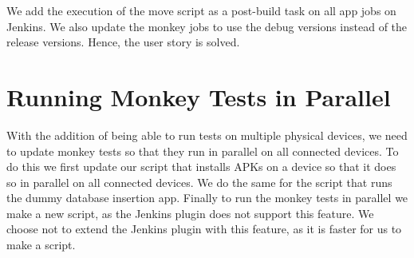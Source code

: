 We add the execution of the move script as a post-build task on all app jobs on Jenkins. We also update the monkey jobs to use the debug versions instead of the release versions. Hence, the user story is solved.

\section{Running Monkey Tests in Parallel}\label{sec:monkey_in_parallel}
With the addition of being able to run tests on multiple physical devices, we need to update monkey tests so that they run in parallel on all connected devices. To do this we first update our script that installs APKs on a device so that it does so in parallel on all connected devices. We do the same for the script that runs the dummy database insertion app. Finally to run the monkey tests in parallel we make a new script, as the Jenkins plugin does not support this feature. We choose not to extend the Jenkins plugin with this feature, as it is faster for us to make a script.

